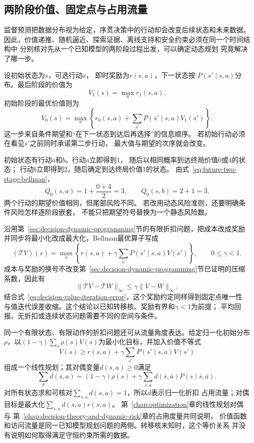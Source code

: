 \subsection{两阶段价值、固定点与占用流量}
\label{sec:future-two-step-fixed-point-occupancy}

监督预测把数据分布视为给定，序贯决策中的行动却会改变后续状态和未来数据。
因此，价值递推、随机逼近、探索证据、离线支持和安全约束必须在同一个时间结构中
分别核对先从一个已知模型的两阶段过程出发，可以确定动态规划
究竟解决了哪一步。

设初始状态为$s$，可选行动$a$，
即时奖励为$r(s,a)$，下一状态按
$P(s'\mid s,a)$分布。最后阶段的价值为
\[
  V_1(s)
  =
  \max_a r_1(s,a).
\]
初始阶段的最优价值则为
\begin{equation}
  V_0(s)
  =
  \max_a
  \left\{
    r_0(s,a)
    +
    \sum_{s'}P(s'\mid s,a)V_1(s')
  \right\}.
  \label{eq:future-two-stage-bellman}
\end{equation}
这一步来自条件期望和“在下一状态到达后再选择”的信息顺序。
若初始行动必须在看见$s'$之前同时承诺第二步行动，
最大值与期望的次序就会改变。

\begin{example}[即时奖励与未来价值]
  \label{ex:future-two-stage-decision}
  初始状态有行动$a$和$b$。行动$a$立即得到$1$，
  随后以相同概率到达终局价值$0$或$4$的状态；
  行动$b$立即得到$2$，随后确定到达终局价值$1$的状态。
  由式~\eqref{eq:future-two-stage-bellman}，
  \[
    Q_0(s,a)=1+\frac{0+4}{2}=3,
    \qquad
    Q_0(s,b)=2+1=3.
  \]
  两个行动的期望价值相同，但尾部风险不同。
  若改用动态风险准则，还要明确条件风险怎样逐阶段嵌套，
  不能只把期望符号替换为一个静态风险数。
\end{example}

沿用第~\ref{sec:decision-dynamic-programming}节的有限折扣问题，把成本改成奖励并同步将最小化改成最大化，Bellman最优算子写成
\[
  (\mathcal{T}V)(s)
  =
  \max_a
  \left\{
    r(s,a)
    +
    \gamma
    \sum_{s'}P(s'\mid s,a)V(s')
  \right\},
  \qquad 0\leq\gamma<1.
\]
成本与奖励的换号不改变第~\ref{sec:decision-dynamic-programming}节已证明的压缩系数，因此有
\[
  \lVert\mathcal{T}V-\mathcal{T}W\rVert_\infty
  \leq
  \gamma\lVert V-W\rVert_\infty.
\]
结合式~\eqref{eq:decision-value-iteration-error}，这个奖励约定同样得到固定点唯一性
与值迭代误差收缩。这个结论以已知转移核、奖励有界和$\gamma<1$为前提；
平均回报、无折扣或连续状态问题需要不同的空间与条件。

同一个有限状态、有限动作的折扣问题还可从流量角度表达。给定归一化初始分布
$\rho$，以$(1-\gamma)\sum_s\rho(s)V(s)$为最小化目标，并加入价值不等式
\[
  V(s)
  \geq
  r(s,a)
  +
  \gamma\sum_{s'}P(s'\mid s,a)V(s')
\]
组成一个线性规划；其对偶变量$d(s,a)\geq0$满足
\begin{equation}
  \sum_a d(s,a)
  =
  (1-\gamma)\rho(s)
  +
  \gamma
  \sum_{\bar s,\bar a}
  d(\bar s,\bar a)P(s\mid\bar s,\bar a).
  \label{eq:future-discounted-occupancy-flow}
\end{equation}
对所有状态求和可核对$\sum_{s,a}d(s,a)=1$，所以$d$表示归一化折扣
占用流量；对偶目标是最大化$\sum_{s,a}d(s,a)r(s,a)$。
第~\ref{chap:optimization}章的线性规划对偶与
第~\ref{chap:decision-theory-and-dynamic-risk}章的占用度量共同说明，
价值函数和访问流量是同一已知模型规划问题的两侧。转移核未知时，这个等价关系
并没有说明如何取得满足守恒约束所需的数据。

